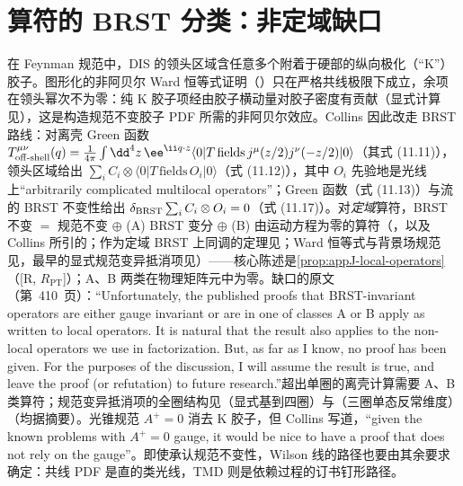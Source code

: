 \section{算符的 BRST 分类：非定域缺口}\label{sec:front-brst}

\begin{remark}\label{rem:front-k-gluon}
在 Feynman 规范中，DIS 的领头区域含任意多个附着于硬部的纵向极化（“K”）胶子。图形化的非阿贝尔 Ward 恒等式证明\cite{Labastida:1984gy}（\cite[第~11.9~节]{Collins2011}）只在严格共线极限下成立，余项在领头幂次不为零：纯 K 胶子项经由胶子横动量对胶子密度有贡献（显式计算见\cite{Collins:2008sg}），这是构造规范不变胶子 PDF 所需的非阿贝尔效应。Collins 因此改走 BRST 路线\cite[第~11.3.2~节，第~407--410~页]{Collins2011}：对离壳 Green 函数 $T^{\mu\nu}_{\rm off\text{-}shell}(q)=\frac1{4\pi}\int\dd^4z\,\ee^{\ii q\cdot z}\langle0|T\,\text{fields}\,j^\mu(z/2)j^\nu(-z/2)|0\rangle$（其式 (11.11)），领头区域给出 $\sum_iC_i\otimes\langle0|T\,\text{fields}\,O_i|0\rangle$（式 (11.12)），其中 $O_i$ 先验地是光线上“arbitrarily complicated multilocal operators”；Green 函数（式 (11.13)）与流的 BRST 不变性给出 $\delta_{\rm BRST}\sum_iC_i\otimes O_i=0$（式 (11.17)）。对\emph{定域}算符，BRST 不变 $=$ 规范不变 $\oplus$ (A) BRST 变分 $\oplus$ (B) 由运动方程为零的算符（\cite{Joglekar:1975nu}，以及 Collins 所引的\cite{Joglekar:1976eb,Joglekar:1976pe,Nakanishi:1990qm}；作为定域 BRST 上同调的定理见\cite{Henneaux:1993jn,Barnich:2000zw}；Ward 恒等式与背景场规范见\cite{Kluberg-Stern:1974iel,Kluberg-Stern:1974nmx,Kluberg-Stern:1975ebk}，最早的显式规范变异抵消项见\cite{DixonTaylor1974}）——核心陈述是\cref{prop:appJ-local-operators}（[R, $R_{\mathrm{PT}}$]）；A、B 两类在物理矩阵元中为零。缺口的原文（第~410~页）：“Unfortunately, the published proofs that BRST-invariant operators are either gauge invariant or are in one of classes A or B apply as written to local operators. It is natural that the result also applies to the non-local operators we use in factorization. But, as far as I know, no proof has been given. For the purposes of the discussion, I will assume the result is true, and leave the proof (or refutation) to future research.”超出单圈的离壳计算需要 A、B 类算符\cite{Hamberg:1991qt,Collins:1994ee}；规范变异抵消项的全圈结构见\cite{Falcioni:2022fdm}（显式基到四圈）与\cite{Gehrmann:2023ksf}（三圈单态反常维度）（均据摘要）。光锥规范 $A^+=0$ 消去 K 胶子，但 Collins 写道，“given the known problems with $A^+=0$ gauge, it would be nice to have a proof that does not rely on the gauge”。即使承认规范不变性，Wilson 线的路径也要由其余要求确定：共线 PDF 是直的类光线，TMD 则是依赖过程的订书钉形路径。
\end{remark}

